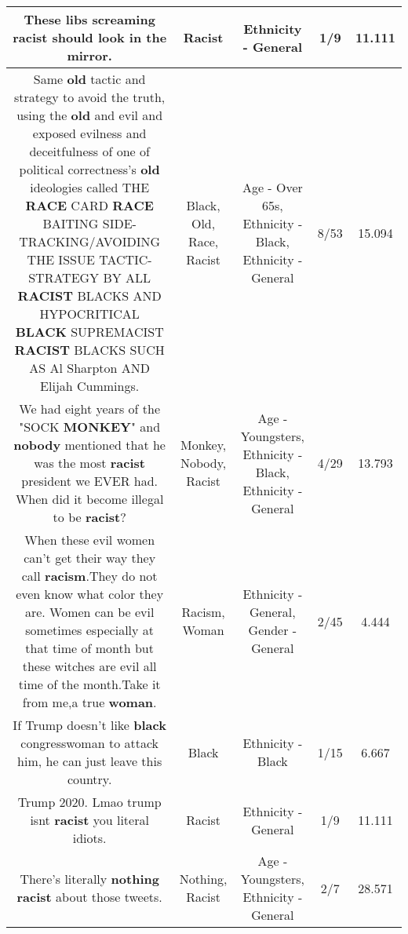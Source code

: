 \documentclass[11pt]{article}
\newlength\mylength
\begin{document}
\begin{center}
\begin{longtable}{|C{.65\mylength}|C{.30\mylength}|C{.12\mylength}|C{.12\mylength}|C{.12\mylength}|}
  \small These libs screaming \textbf{racist} should look in the mirror.\normalsize   & Racist & Ethnicity - General & 1/9 & 11.111 \\  \hline
  \small Same \textbf{old} tactic and strategy to avoid the truth, using the \textbf{old} and evil and exposed evilness and deceitfulness of one of political correctness's \textbf{old} ideologies called THE \textbf{RACE} CARD \textbf{RACE} BAITING SIDE-TRACKING/AVOIDING THE ISSUE TACTIC-STRATEGY BY ALL \textbf{RACIST} BLACKS AND HYPOCRITICAL \textbf{BLACK} SUPREMACIST \textbf{RACIST} BLACKS SUCH AS Al Sharpton AND Elijah Cummings.\normalsize   & Black, Old, Race, Racist & Age - Over 65s, Ethnicity - Black, Ethnicity - General & 8/53 & 15.094 \\  \hline
  \small We had eight years of the "SOCK \textbf{MONKEY}" and \textbf{nobody} mentioned that he was the most \textbf{racist} president we EVER had. When did it become illegal to be \textbf{racist}?\normalsize   & Monkey, Nobody, Racist & Age - Youngsters, Ethnicity - Black, Ethnicity - General & 4/29 & 13.793 \\  \hline
  \small When these evil women can't get their way they call \textbf{racism}.They do not even know what color they are. Women can be evil  sometimes especially at that time of month but these witches are evil all time of the month.Take it from me,a true \textbf{woman}.\normalsize   & Racism, Woman & Ethnicity - General, Gender - General & 2/45 & 4.444 \\  \hline
  \small If Trump doesn't like \textbf{black} congresswoman to attack him, he can just leave this country.\normalsize   & Black & Ethnicity - Black & 1/15 & 6.667 \\  \hline
  \small Trump 2020. Lmao trump isnt \textbf{racist} you literal idiots.\normalsize   & Racist & Ethnicity - General & 1/9 & 11.111 \\  \hline
  \small There's literally \textbf{nothing} \textbf{racist} about those tweets.\normalsize   & Nothing, Racist & Age - Youngsters, Ethnicity - General & 2/7 & 28.571 \\  \hline

\end{longtable}
\end{center}
\end{document}
